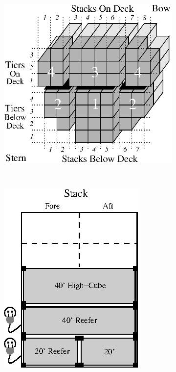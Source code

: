 \documentclass[preprint,11pt,3p]{elsarticle}
\begin{document}
\begin{figure}[ht]
    \centering
    \begin{subfigure}[b]{0.35\textwidth}
        \includegraphics[width=\textwidth]{Figures/bay.eps}
        \caption{}
        \label{fig:bay}
    \end{subfigure}
    ~
    \begin{subfigure}[b]{0.28\textwidth}
        \includegraphics[width=\textwidth]{Figures/stack.eps}

\end{subfigure}
\end{figure}
\end{document}
